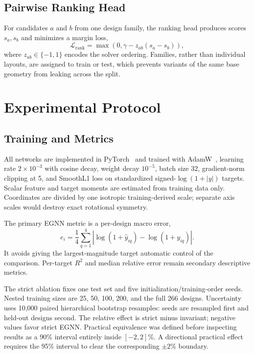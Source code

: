 \documentclass[letterpaper,twocolumn,9pt]{extarticle}
\begin{document}
\subsection{Pairwise Ranking Head}
For candidates $a$ and $b$ from one design family, the ranking head produces scores $s_a,s_b$ and minimizes a margin loss,
\begin{equation}
\mathcal{L}_{\mathrm{rank}}=\max\left(0,\gamma-z_{ab}(s_a-s_b)\right),
\end{equation}
where $z_{ab}\in\{-1,1\}$ encodes the solver ordering. Families, rather than individual layouts, are assigned to train or test, which prevents variants of the same base geometry from leaking across the split.

\section{Experimental Protocol}
\subsection{Training and Metrics}
All networks are implemented in PyTorch~\cite{pytorch} and trained with AdamW~\cite{adamw}, learning rate $2\times10^{-3}$ with cosine decay, weight decay $10^{-5}$, batch size 32, gradient-norm clipping at 5, and SmoothL1 loss on standardized signed-$\log(1+|y|)$ targets. Scalar feature and target moments are estimated from training data only. Coordinates are divided by one isotropic training-derived scale; separate axis scales would destroy exact rotational symmetry.

The primary EGNN metric is a per-design macro error,
\begin{equation}
e_i=\frac{1}{4}\sum_{q=1}^{4}\left|\log(1+\hat y_{iq})-\log(1+y_{iq})\right|.
\end{equation}
It avoids giving the largest-magnitude target automatic control of the comparison. Per-target $R^2$ and median relative error remain secondary descriptive metrics.

The strict ablation fixes one test set and five initialization/training-order seeds. Nested training sizes are 25, 50, 100, 200, and the full 266 designs. Uncertainty uses 10,000 paired hierarchical bootstrap resamples: seeds are resampled first and held-out designs second. The relative effect is strict minus invariant; negative values favor strict EGNN. Practical equivalence was defined before inspecting results as a 90\% interval entirely inside $[-2,2]$\%. A directional practical effect requires the 95\% interval to clear the corresponding $\pm2$\% boundary.
\end{document}
